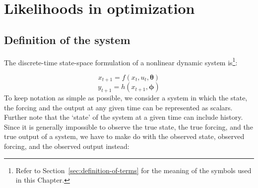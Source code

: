 %
%
%
%


\chapter{Likelihoods in optimization}
\label{ch:likelihoods-in-optimization}


\section{Definition of the system}


The discrete-time state-space formulation of a nonlinear dynamic system is\footnote{Refer to Section~\ref{sec:definition-of-terms} for the meaning of the symbols used in this Chapter.}:

\begin{equation}\label{eq:true-state}
x_{t+1}=f(x_t,u_t,\boldsymbol\theta)
\end{equation}
\begin{equation}\label{eq:true-output}
y_{t+1}=h(x_{t+1},\boldsymbol\phi)
\end{equation}
To keep notation as simple as possible, we consider a system in which the state, the forcing and the output at any given time can be represented as scalars. Further note that the `state' of the system at a given time can include history.
Since it is generally impossible to observe the true state, the true forcing, and the true output of a system, we have to make do with the observed state, observed forcing, and the observed output instead:


